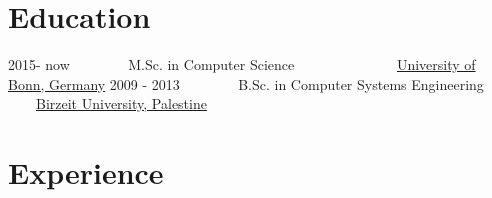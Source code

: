\documentclass[letterpaper]{twentysecondcv} %
\begin{document}
\makeprofile %

\section{Education}

\begin{twenty} %
	\twentyitem
    	{2015- now }
        { }
        {~~~~~~~ M.Sc.  in  Computer Science}        
        {~~~~~~~~~~~~~~\href{https://www.uni-bonn.de/}{University of Bonn, Germany}}
        {}
        {}
	\twentyitem
    	{2009 - 2013  }
		{}
        {~~~~~~~ B.Sc. in Computer Systems Engineering }       
        {~~~~\href{https://www.birzeit.edu/en}{Birzeit University,  Palestine}}
         {}
         {}
\end{twenty}




\section{Experience}
\end{document}
